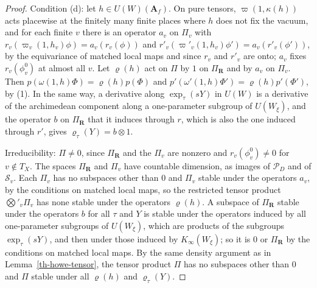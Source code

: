 \begin{proof}
Condition (d): let $h\in U(W)(\mathbf A_f)$. On pure tensors,
$\varpi(1,\kappa(h))$ acts placewise at the finitely many finite places where
$h$ does not fix the vacuum, and for each finite $v$ there is an operator
$a_v$ on $\Pi_v$ with $r_v(\varpi_v(1,h_v)\phi)=a_v(r_v(\phi))$ and
$r'_v(\varpi'_v(1,h_v)\phi')=a_v(r'_v(\phi'))$, by the equivariance of matched
local maps and since $r_v$ and $r'_v$ are onto; $a_v$ fixes $r_v(\phi^0_v)$
at almost all $v$. Let $\varrho(h)$ act on $\Pi$ by $1$ on $\Pi_{\mathbf R}$
and by $a_v$ on $\Pi_v$. Then $p(\omega(1,h)\Phi)=\varrho(h)p(\Phi)$ and
$p'(\omega'(1,h)\Phi')=\varrho(h)p'(\Phi')$, by (1). In the same way, a
derivative along $\exp_\tau(sY)$ in $U(W)$ is a derivative of the archimedean
component along a one-parameter subgroup of $U(W_\xi)$, and the operator $b$
on $\Pi_{\mathbf R}$ that it induces through $r$, which is also the one
induced through $r'$, gives $\varrho_\tau(Y)=b\otimes1$.

Irreducibility: $\Pi\neq0$, since $\Pi_{\mathbf R}$ and the $\Pi_v$ are
nonzero and $r_v(\phi^0_v)\neq0$ for $v\notin T_X$. The spaces
$\Pi_{\mathbf R}$ and $\Pi_v$ have countable dimension, as images of
$\mathcal P_D$ and of $\mathcal S_v$. Each $\Pi_v$ has no subspaces other than
$0$ and $\Pi_v$ stable under the operators $a_v$, by the conditions on matched
local maps, so the restricted tensor product $\bigotimes'_v\Pi_v$ has none
stable under the operators $\varrho(h)$. A subspace of $\Pi_{\mathbf R}$ stable
under the operators $b$ for all $\tau$ and $Y$ is stable under the operators
induced by all one-parameter subgroups of $U(W_\xi)$, which are products of the
subgroups $\exp_\tau(sY)$, and then under those induced by $K_\infty(W_\xi)$;
so it is $0$ or $\Pi_{\mathbf R}$ by the conditions on matched local maps. By
the same density argument as in Lemma~\ref{th-howe-tensor}, the tensor product
$\Pi$ has no subspaces other than $0$ and $\Pi$ stable under all $\varrho(h)$
and $\varrho_\tau(Y)$.
\end{proof}

